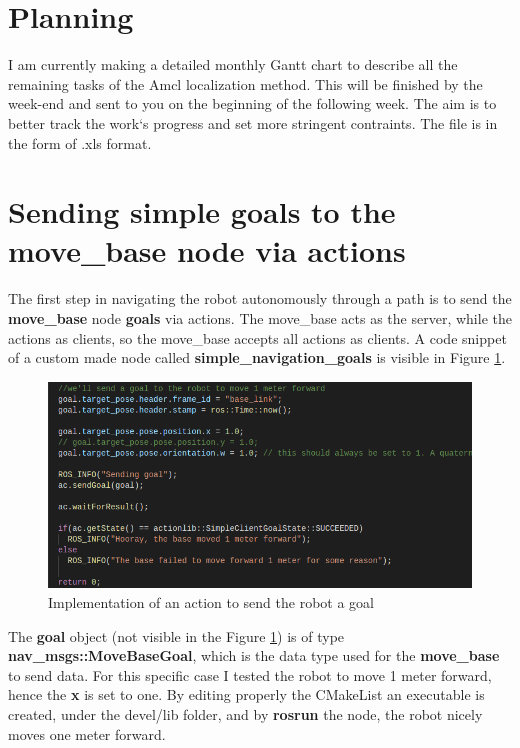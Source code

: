 \documentclass[11pt,a4paper]{article}
\begin{document}

%
%



\section{Planning} \label{sec:planning}

I am currently making a detailed monthly Gantt chart to describe all the remaining tasks of the Amcl localization method. This will be finished by the week-end and sent to you on the beginning of the following week. The aim is to better track the work`s progress and set more stringent contraints. The file is in the form of .xls format.



\section{Sending simple goals to the move{\_}base node via actions} \label{sec:move-base}

The first step in navigating the robot autonomously through a path is to send the \textbf{move{\_}base} node \textbf{goals} via actions. The move{\_}base acts as the server, while the actions as clients, so the move{\_}base accepts all actions as clients. A code snippet of a custom made node called \textbf{simple{\_}navigation{\_}goals} is visible in Figure \ref{fig:send_goals}.

\begin{figure}[!htb]
	\center
	\includegraphics[width=.7\textwidth]{figures/send_goals.png}
	\caption{Implementation of an action to send the robot a goal}
	\label{fig:send_goals}
\end{figure}

The \textbf{goal} object (not visible in the Figure \ref{fig:send_goals}) is of type \textbf{nav{\_}msgs::MoveBaseGoal}, which is the data type used for the \textbf{move{\_}base} to send data. For this specific case I tested the robot to move 1 meter forward, hence the \textbf{x} is set to one. By editing properly the CMakeList an executable is created, under the devel/lib folder, and by \textbf{rosrun} the node, the robot nicely moves one meter forward. 
\end{document}
